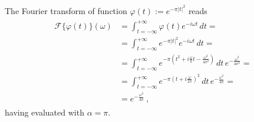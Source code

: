 \documentclass[letterpaper,10pt,english]{jupyterBook}
\begin{document}
\sphinxAtStartPar
{} The Fourier transform of function \(\varphi(t):= e^{-\pi|t|^2}\) reads
\begin{equation*}
\begin{split}\begin{aligned}
\mathscr{F}\{ \varphi(t) \}(\omega) 
 & = \int_{t=-\infty}^{+\infty} \varphi(t) e^{-i \omega t} \, dt = \\ 
 & = \int_{t=-\infty}^{+\infty} e^{-\pi|t|^2} e^{-i \omega t} \, dt = \\
 & = \int_{t=-\infty}^{+\infty} e^{-\pi \left( t^2 + i \frac{\omega}{\pi} t - \frac{\omega^2}{4 \pi^2}  \right)} \, dt \, e^{- \frac{\omega^2}{4 \pi^2}} = \\
 & = \int_{t=-\infty}^{+\infty} e^{-\pi \left( t + i \frac{\omega}{2 \pi}  \right)^2} \, dt \, e^{- \frac{\omega^2}{4 \pi}} = \\
 & = e^{- \frac{\omega^2}{4 \pi}} \ ,
\end{aligned}\end{split}
\end{equation*}
\sphinxAtStartPar
having evaluated {\hyperref[\detokenize{ch/functional-analysis/dirac-delta:integral-e-x2}]{}} with \(\alpha = \pi\).  
\end{document}
